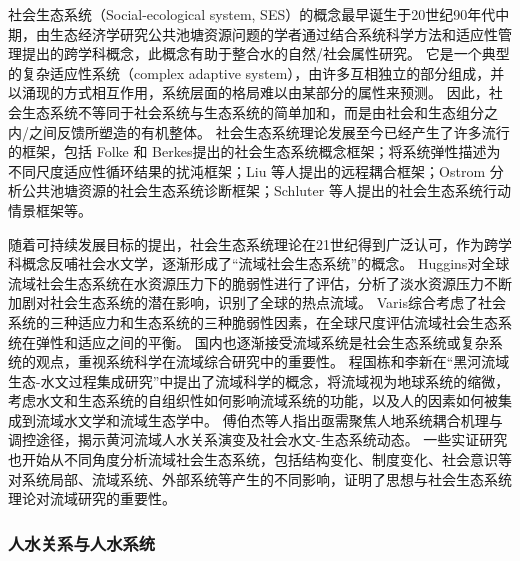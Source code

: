 社会\textendash{}生态系统（Social-ecological system, SES）的概念最早诞生于20世纪90年代中期，由生态经济学研究公共池塘资源问题的学者通过结合系统科学方法和适应性管理提出的跨学科概念\cite{biggs2021}，此概念有助于整合水的自然/社会属性研究\cite{fowler2022}。
它是一个典型的复杂适应性系统（complex adaptive system），由许多互相独立的部分组成，并以涌现的方式相互作用，系统层面的格局难以由某部分的属性来预测\cite{schluter2019}。
因此，社会\textendash{}生态系统不等同于社会系统与生态系统的简单加和，而是由社会和生态组分之内/之间反馈所塑造的有机整体\cite{biggs2021}。
社会\textendash{}生态系统理论发展至今已经产生了许多流行的框架，包括 Folke 和 Berkes提出的社会\textendash{}生态系统概念框架\cite{berkes2008}；将系统弹性描述为不同尺度适应性循环结果的扰沌框架\cite{gunderson2001}；Liu 等人提出的远程耦合框架\cite{liu2018}；Ostrom 分析公共池塘资源的社会\textendash{}生态系统诊断框架\cite{ostrom2009}；Schluter 等人提出的社会\textendash{}生态系统行动情景框架等\cite{schluter2019}。

随着可持续发展目标的提出，社会\textendash{}生态系统理论在21世纪得到广泛认可，作为跨学科概念反哺社会水文学，逐渐形成了“流域社会\textendash{}生态系统”的概念。
Huggins对全球流域社会\textendash{}生态系统在水资源压力下的脆弱性进行了评估，分析了淡水资源压力不断加剧对社会\textendash{}生态系统的潜在影响，识别了全球的热点流域\cite{huggins2022}。
Varis综合考虑了社会系统的三种适应力和生态系统的三种脆弱性因素，在全球尺度评估流域社会\textendash{}生态系统在弹性和适应之间的平衡\cite{varis2019}。
国内也逐渐接受流域系统是社会\textendash{}生态系统或复杂系统的观点，重视系统科学在流域综合研究中的重要性。
程国栋和李新在“黑河流域生态-水文过程集成研究”中提出了流域科学的概念，将流域视为地球系统的缩微，考虑水文和生态系统的自组织性如何影响流域系统的功能，以及人的因素如何被集成到流域水文学和流域生态学中\cite{cheng2015}。
傅伯杰等人指出亟需聚焦人地系统耦合机理与调控途径，揭示黄河流域人\textendash{}水关系演变及社会\textendash{}水文-生态系统动态\cite{fu2021}。
一些实证研究也开始从不同角度分析流域社会\textendash{}生态系统，包括结构变化\cite{song2022}、制度变化\cite{wang2019c}、社会意识\cite{liu2023}等对系统局部、流域系统、外部系统等产生的不同影响，证明了思想与社会\textendash{}生态系统理论对流域研究的重要性。

\subsubsection{人\textendash{}水关系与人\textendash{}水系统}

